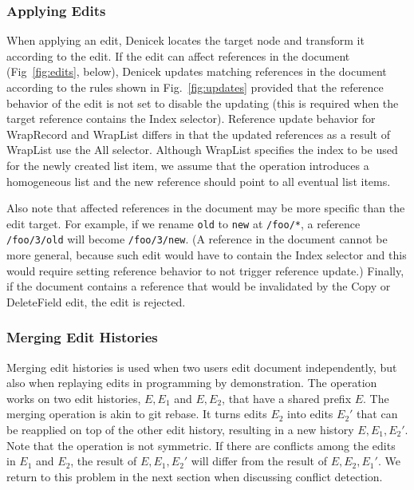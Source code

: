 \documentclass[sigconf,anonymous,screen]{acmart}
\newcommand{\ident}[1]{{\sffamily #1}}
\begin{document}
\subsubsection*{Applying Edits}
When applying an edit, Denicek locates the target node and transform it according to the edit. If
the edit can affect references in the document (Fig~\ref{fig:edits}, below), Denicek updates
matching references in the document according to the rules shown in Fig.~\ref{fig:updates} provided
that the reference behavior of the edit is not set to disable the updating (this is required when
the target reference contains the \ident{Index} selector). Reference update behavior for
\ident{WrapRecord} and \ident{WrapList} differs in that the updated references as a result of
\ident{WrapList} use the \ident{All} selector. Although \ident{WrapList} specifies the index to
be used for the newly created list item, we assume that the operation introduces a homogeneous
list and the new reference should point to all eventual list items.

Also note that affected references in the document may be more specific than the edit
target. For example, if we rename {\small\Verb|old|} to {\small\Verb|new|} at {\small\Verb|/foo/*|},
a reference {\small\Verb|/foo/3/old|} will become {\small\Verb|/foo/3/new|}. (A reference in the
document cannot be more general, because such edit would have to contain the \ident{Index} selector
and this would require setting reference behavior to not trigger reference update.) Finally,
if the document contains a reference that would be invalidated by the \ident{Copy} or
\ident{DeleteField} edit, the edit is rejected.

\subsubsection*{Merging Edit Histories}
Merging edit histories is used when two users edit document independently, but also
when replaying edits in programming by demonstration. The
operation works on two edit histories, $E, E_1$ and $E, E_2$, that have a shared prefix $E$.
The merging operation is akin to git rebase. It turns edits $E_2$ into edits $E_2'$ that
can be reapplied on top of the other edit history, resulting in a new history $E, E_1, E_2'$.
Note that the operation is not symmetric. If there are conflicts among the edits in $E_1$ and
$E_2$, the result of $E, E_1, E_2'$ will differ from the result of $E, E_2, E_1'$.
We return to this problem in the next section when discussing conflict detection.
\end{document}
